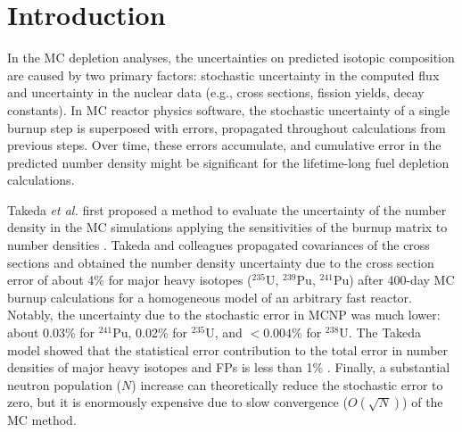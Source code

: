\section{Introduction}
In the \gls{MC} depletion analyses, the uncertainties on predicted isotopic 
composition are caused by two primary factors: stochastic uncertainty in 
the computed flux and uncertainty in the nuclear data (e.g., cross sections, 
fission yields, decay constants). In \gls{MC} reactor physics software, the 
stochastic uncertainty of a single burnup step is superposed with errors, 
propagated throughout calculations from previous steps. Over time, these 
errors accumulate, and cumulative error in the predicted number density might 
be significant for the lifetime-long fuel depletion calculations.

Takeda \emph{et al.} \cite{takeda_estimation_1999} first proposed a method to 
evaluate the uncertainty of the number density in the \gls{MC} simulations 
applying the sensitivities of the burnup matrix to number densities 
\cite{takeda_estimation_1999}. Takeda and colleagues propagated 
covariances of the cross sections and obtained the number density uncertainty 
due to the cross section error of about 4\% for major heavy isotopes 
($^{235}$U, $^{239}$Pu, $^{241}$Pu) after 400-day \gls{MC} burnup calculations 
for a homogeneous model of an arbitrary fast reactor. 
Notably, the uncertainty due to the stochastic error in MCNP 
was much lower: about 0.03\% for $^{241}$Pu, 0.02\% for $^{235}$U, and 
$<0.004$\% for $^{238}$U. The Takeda model showed that the statistical error 
contribution to the total error in number densities of major heavy isotopes 
and \glspl{FP} is less than 1\% \cite{takeda_estimation_1999}. Finally, 
a substantial neutron population ($N$) increase can theoretically reduce the 
stochastic error to zero, but it is enormously expensive due to slow 
convergence ($O(\sqrt{N})$) of the MC method.

